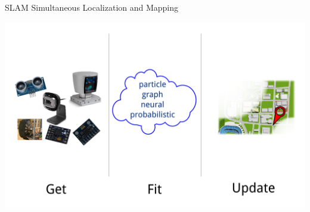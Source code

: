 \documentclass[17pt,mathserif]{beamer}
\begin{document}
    \begin{frame}{SLAM} {Simultaneous Localization and Mapping}
      \vspace*{-3em}
      \begin{center}
        \includegraphics[width=\textwidth]{slam-alg}
      \end{center}
      
    \end{frame}
    
\end{document}
